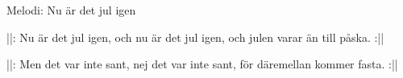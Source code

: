 \begin{song}

\begin{songmeta}
Melodi: Nu är det jul igen
\end{songmeta}

\begin{songtext}
||: Nu är det jul igen,
och nu är det jul igen,
och julen varar än till påska. :||

||: Men det var inte sant,
nej det var inte sant,
för däremellan kommer fasta. :||
\end{songtext}
\end{song}
